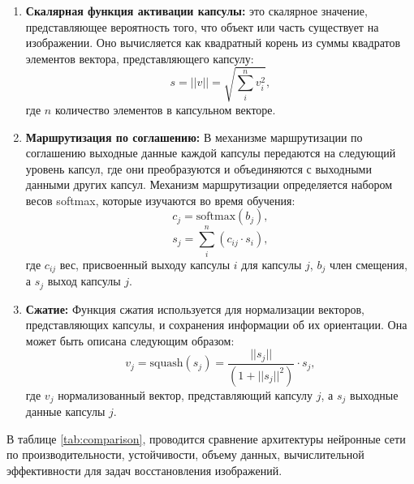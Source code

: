 \begin{enumerate}
	\item \textbf{Скалярная функция активации капсулы:} это скалярное значение, представляющее вероятность того, что объект или часть существует на изображении. Оно вычисляется как квадратный корень из суммы квадратов элементов вектора, представляющего капсулу:
		\begin{equation}
			s = ||v|| = \sqrt{\sum_{i}^{n} v_{i}^{2}},
		\end{equation}
		где \(n\) количество элементов в капсульном векторе.

	\item \textbf{Маршрутизация по соглашению:} В механизме маршрутизации по соглашению выходные данные каждой капсулы передаются на следующий уровень капсул, где они преобразуются и объединяются с выходными данными других капсул. Механизм маршрутизации определяется набором весов softmax, которые изучаются во время обучения:
		\begin{equation}
			c_{j} = \text{softmax}(b_{j}),
		\end{equation}
		\begin{equation}
			s_{j} = \sum_{i}^{n}(c_{ij} \cdot s_{i}),
		\end{equation}
   		где \(c_{ij}\) вес, присвоенный выходу капсулы \(i\) для капсулы \(j\), \(b_{j}\) член смещения, а \(s_{j}\) выход капсулы \(j\).

	\item \textbf{Сжатие:} Функция сжатия используется для нормализации векторов, представляющих капсулы, и сохранения информации об их ориентации. Она может быть описана следующим образом:
		\begin{equation}
			v_{j} = \text{squash}(s_{j}) = \frac{||s_{j}||}{(1 + ||s_{j}||^{2})} \cdot s_{j},
		\end{equation}
   		где \(v_{j}\) нормализованный вектор, представляющий капсулу \(j\), а \(s_{j}\) выходные данные капсулы \(j\).
\end{enumerate}

В таблице \ref{tab:comparison}, проводится сравнение архитектуры нейронные сети по производительности, устойчивости, объему данных, вычислительной эффективности для задач восстановления изображений.

